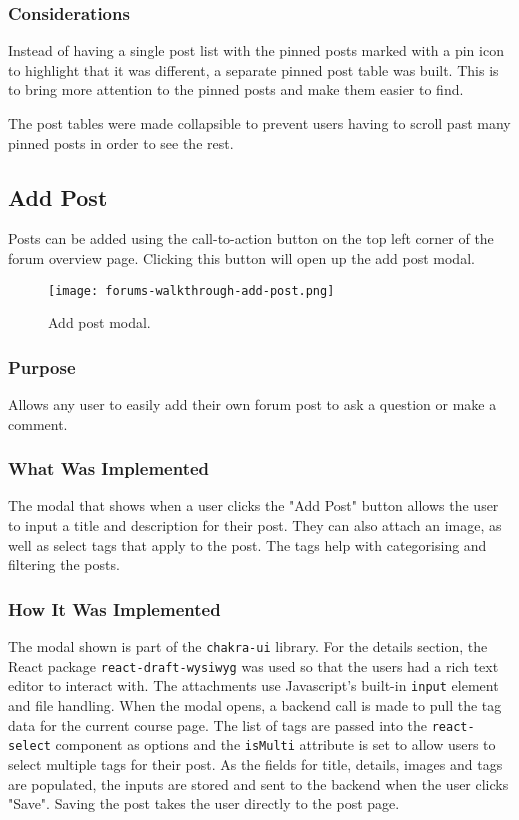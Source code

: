 \subsubsection{Considerations}
Instead of having a single post list with the pinned posts marked with a pin icon to highlight that it was different, a separate pinned post table was built.
This is to bring more attention to the pinned posts and make them easier to find.

The post tables were made collapsible to prevent users having to scroll past many pinned posts in order to see the rest.

\subsection{Add Post}
Posts can be added using the call-to-action button on the top left corner of the forum overview page.
Clicking this button will open up the add post modal.

\begin{figure}[h!]
    \texttt{[image: forums-walkthrough-add-post.png]}
    \centering
    \caption{Add post modal.}
\end{figure}

\subsubsection{Purpose}
Allows any user to easily add their own forum post to ask a question or make a comment.

\subsubsection{What Was Implemented}
The modal that shows when a user clicks the "Add Post" button allows the user to input a title and description for their post.
They can also attach an image, as well as select tags that apply to the post. The tags help with categorising and filtering the posts.

\subsubsection{How It Was Implemented}
The modal shown is part of the \texttt{chakra-ui} library.
For the details section, the React package \texttt{react-draft-wysiwyg} was used so that the users had a rich text editor to interact with.
The attachments use Javascript's built-in \texttt{input} element and file handling.
When the modal opens, a backend call is made to pull the tag data for the current course page.
The list of tags are passed into the \texttt{react-select} component as options and the \texttt{isMulti} attribute is set to allow users to select multiple tags for their post.
As the fields for title, details, images and tags are populated, the inputs are stored and sent to the backend when the user clicks "Save".
Saving the post takes the user directly to the post page.

